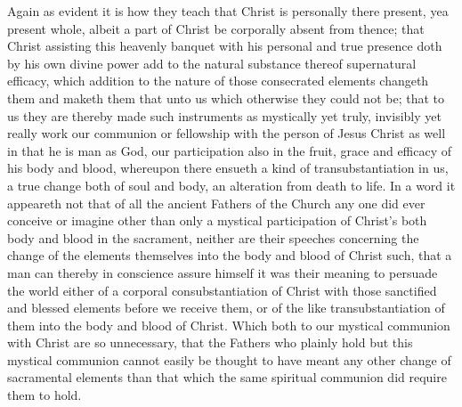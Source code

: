 Again as evident it is how they teach that Christ is personally there present, yea present whole, albeit a part of Christ be corporally absent from thence; that Christ assisting this heavenly banquet with his personal and true presence doth by his own divine power add to the natural substance thereof supernatural efficacy, which addition to the nature of those consecrated elements changeth them and maketh them that  unto us which otherwise they could not be; that to us they are thereby made such instruments as mystically yet truly, invisibly yet really work our communion or fellowship with the person of Jesus Christ as well in that he is man as God, our participation also in the fruit, grace and efficacy of his body and blood, whereupon there ensueth a kind of transubstantiation in us, a true change both of soul and body, an alteration from death to life. In a word it appeareth not that of all the ancient Fathers of the Church any one did ever conceive or imagine other than only a mystical participation of Christ’s both body and blood in the sacrament, neither are their speeches concerning the change of the elements themselves into the body and blood of Christ such, that a man can thereby in conscience assure himself it was their meaning to persuade the world either of a corporal consubstantiation of Christ with those sanctified and blessed elements before we receive them, or of the like transubstantiation of them into the body and blood of Christ. Which both to our mystical communion with Christ are so unnecessary, that the Fathers who  plainly hold but this mystical communion cannot easily be thought to have meant any other change of sacramental elements than that which the same spiritual communion did require them to hold.

